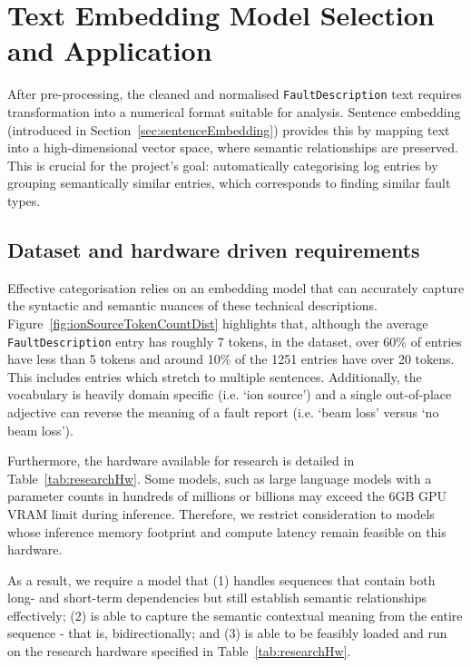 \documentclass[10pt,oneside]{report}
\begin{document}
\section{Text Embedding Model Selection and Application}
After pre-processing, the cleaned and normalised \texttt{FaultDescription} text requires transformation into a numerical format suitable for analysis. Sentence embedding (introduced in Section~\ref{sec:sentenceEmbedding}) provides this by mapping text into a high-dimensional vector space, where semantic relationships are preserved. This is crucial for the project's goal: automatically categorising log entries by grouping semantically similar entries, which corresponds to finding similar fault types. 

\subsection{Dataset and hardware driven requirements}
Effective categorisation relies on an embedding model that can accurately capture the syntactic and semantic nuances of these technical descriptions. Figure~\ref{fig:ionSourceTokenCountDist} highlights that, although the average \texttt{FaultDescription} entry has roughly 7 tokens, in the dataset, over 60\% of entries have less than 5 tokens and around 10\% of the 1251 entries have over 20 tokens. This includes entries which stretch to multiple sentences. Additionally, the vocabulary is heavily domain specific (i.e. `ion source') and a single out-of-place adjective can reverse the meaning of a fault report (i.e. `beam loss' versus `no beam loss').  

Furthermore, the hardware available for research is detailed in Table~\ref{tab:researchHw}. Some models, such as large language models with a parameter counts in hundreds of millions or billions may exceed the 6GB GPU VRAM limit during inference. Therefore, we restrict consideration to models whose inference memory footprint and compute latency remain feasible on this hardware.

As a result, we require a model that (1) handles sequences that contain both long- and short-term dependencies but still establish semantic relationships effectively; (2) is able to capture the semantic contextual meaning from the entire sequence - that is, bidirectionally; and (3) is able to be feasibly loaded and run on the research hardware specified in Table~\ref{tab:researchHw}.
\end{document}
